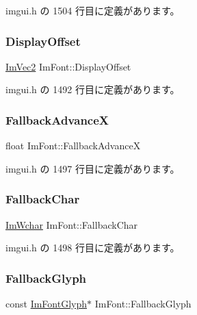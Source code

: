  imgui.\+h の 1504 行目に定義があります。

\mbox{\label{struct_im_font_af9b95f3df0b6d45f45903d82301d7f84}} 
\subsubsection{\texorpdfstring{Display\+Offset}{DisplayOffset}}
{\footnotesize\ttfamily \mbox{\hyperlink{struct_im_vec2}{Im\+Vec2}} Im\+Font\+::\+Display\+Offset}



 imgui.\+h の 1492 行目に定義があります。

\mbox{\label{struct_im_font_ad58a5ee4492a3a9fa56f73e5a40d728d}} 
\subsubsection{\texorpdfstring{Fallback\+AdvanceX}{FallbackAdvanceX}}
{\footnotesize\ttfamily float Im\+Font\+::\+Fallback\+AdvanceX}



 imgui.\+h の 1497 行目に定義があります。

\mbox{\label{struct_im_font_ae54c2c4184bfcbc7b8f6da9cbc4f93c0}} 
\subsubsection{\texorpdfstring{Fallback\+Char}{FallbackChar}}
{\footnotesize\ttfamily \mbox{\hyperlink{imgui_8h_af2c7badaf05a0008e15ef76d40875e97}{Im\+Wchar}} Im\+Font\+::\+Fallback\+Char}



 imgui.\+h の 1498 行目に定義があります。

\mbox{\label{struct_im_font_a0e666b0c49646bd294103f4d288df4b8}} 
\subsubsection{\texorpdfstring{Fallback\+Glyph}{FallbackGlyph}}
{\footnotesize\ttfamily const \mbox{\hyperlink{struct_im_font_glyph}{Im\+Font\+Glyph}}$\ast$ Im\+Font\+::\+Fallback\+Glyph}



